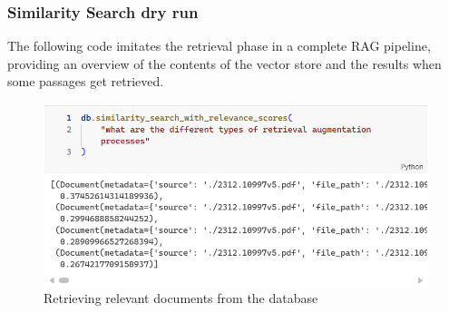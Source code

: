 \subsubsection{Similarity Search dry run}
The following code imitates the retrieval phase in a complete RAG pipeline, providing an overview of the contents of the vector store and the results when some passages get retrieved.\newline
\begin{figure}[htbp]
    \centering
    \includegraphics[width=\linewidth]{./figures/vectorstoresimilaritysearchwithscore_code.png}
    \caption{Retrieving relevant documents from the database}
\end{figure}
